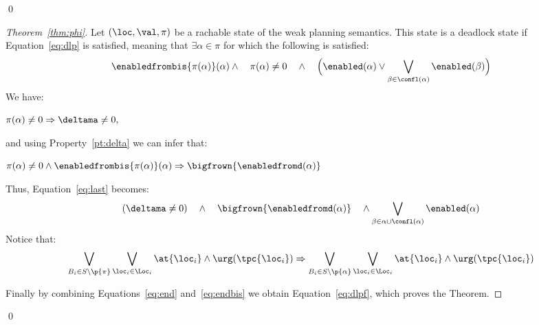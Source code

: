 \qed
\begin{proof}[Theorem~\ref{thm:phi}]
Let $(\loc,\val,\pi)$ be a rachable state of the weak planning semantics. This state is a deadlock state if Equation~\ref{eq:dlp} is
satisfied, meaning that $\exists\alpha\in\pi$ for which the following is satisfied:
\begin{equation}\label{eq:last}
  \enabledfrombis{\pi(\alpha)}(\alpha)\wedge\quad\pi(\alpha)\neq0\quad\wedge\quad\Big(\enabled(\alpha)\vee\bigvee_{\beta\in\confl(\alpha)}\enabled(\beta)\Big)%
\end{equation}
We have:
\begin{description}[labelwidth=1.5cm]
  \item[\namedlabel{l1}{R1}] $\pi(\alpha)\neq0\Rightarrow\deltama\neq0,$ 
\end{description}
and using Property~\ref{pt:delta} we can infer that:
\begin{description}[labelwidth=1.5cm]
  \item[\namedlabel{l2}{R2}] $\pi(\alpha)\neq0\wedge\enabledfrombis{\pi(\alpha)}(\alpha)\Rightarrow\bigfrown{\enabledfromd(\alpha)}$ 
\end{description}
Thus, Equation~\ref{eq:last} becomes:
\begin{equation}\label{eq:end}
  (\deltama\neq0)\quad\wedge\quad\bigfrown{\enabledfromd(\alpha)}\quad\wedge\bigvee_{\beta\in\alpha\cup\confl(\alpha)}\enabled(\alpha)
\end{equation}
Notice that:
\begin{equation}\label{eq:endbis}
  \bigvee_{B_i\in S\setminus\p{\pi}}\bigvee_{\loc_i\in\Loc_i}\at{\loc_i}\wedge\urg(\tpc{\loc_i})\Rightarrow\bigvee_{B_i\in S\setminus\p{\alpha}}\bigvee_{\loc_i\in\Loc_i}\at{\loc_i}\wedge\urg(\tpc{\loc_i})
\end{equation}

Finally by combining Equations~\ref{eq:end} and~\ref{eq:endbis} we obtain Equation~\ref{eq:dlpf}, which proves the Theorem.
\end{proof}
\qed
